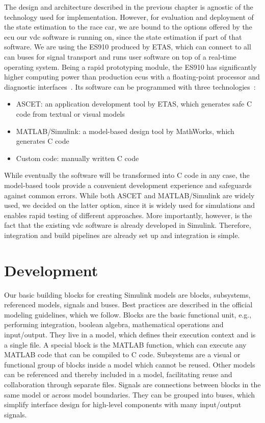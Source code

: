 The design and architecture described in the previous chapter is agnostic of the technology used for implementation. However, for evaluation and deployment of the state estimation to the race car, we are bound to the options offered by the \gls{ecu} our \gls{vdc} software is running on, since the state estimation if part of that software. We are using the ES910 produced by ETAS, which can connect to all \gls{can} buses for signal transport and runs user software on top of a real-time operating system. Being a rapid prototyping module, the ES910 has significantly higher computing power than production \glspl{ecu} with a floating-point processor and diagnostic interfaces~\cite[p.~16]{ETASGmbHStuttgart.2018}. Its software can be programmed with three technologies~\cites[p.~17]{ETASGmbHStuttgart.2018}[p.~10]{ETASGmbHStuttgart.2019}:
\begin{itemize}
\item ASCET: an application development tool by ETAS, which generates safe C code from textual or visual models
\item MATLAB/Simulink: a model-based design tool by MathWorks, which generates C code
\item Custom code: manually written C code
\end{itemize}
While eventually the software will be transformed into C code in any case, the model-based tools provide a convenient development experience and safeguards against common errors. While both ASCET and MATLAB/Simulink are widely used, we decided on the latter option, since it is widely used for simulations and enables rapid testing of different approaches. More importantly, however, is the fact that the existing \gls{vdc} software is already developed in Simulink. Therefore, integration and build pipelines are already set up and integration is simple.


\section{Development}
Our basic building blocks for creating Simulink models are blocks, subsystems, referenced models, signals and buses. Best practices are described in the official modeling guidelines\cite{TheMathWorksInc..2020}, which we follow. Blocks are the basic functional unit, e.g., performing integration, boolean algebra, mathematical operations and input/output. They live in a model, which defines their execution context and is a single file. A special block is the MATLAB function, which can execute any MATLAB code that can be compiled to C code. Subsystems are a visual or functional group of blocks inside a model which cannot be reused. Other models can be referenced and thereby included in a model, facilitating reuse and collaboration through separate files. Signals are connections between blocks in the same model or across model boundaries. They can be grouped into buses, which simplify interface design for high-level components with many input/output signals.

